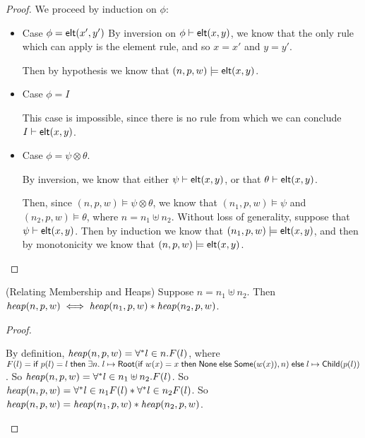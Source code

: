 \begin{proof}
We proceed by induction on $\phi$: 
\begin{itemize}
  \item Case $\phi = \mathsf{elt}({x'}, {y'})$
    By inversion on ${\phi} \vdash \mathsf{elt}({x}, {y})$, we know that the only 
    rule which can apply is the element rule, and so $x = x'$ and $y = y'$. 

    Then by hypothesis we know that $(n, p, w) \models \mathsf{elt}({x}, {y})$. 

  \item Case $\phi = I$

    This case is impossible, since there is no rule from which we can
    conclude ${I} \vdash \mathsf{elt}({x}, {y})$. 

  \item Case $\phi = \psi \otimes \theta$. 

    By inversion, we know that either ${\psi} \vdash \mathsf{elt}({x}, {y})$, or 
    that ${\theta} \vdash \mathsf{elt}({x}, {y})$. 

    Then, since $(n, p, w) \models \psi \otimes \theta$, we know 
    that $(n_1, p, w) \models \psi$ and $(n_2, p, w) \models \theta$,
    where $n = n_1 \uplus n_2$. Without loss of generality, 
    suppose that ${\psi} \vdash \mathsf{elt}({x}, {y})$. Then by induction we know
    that $(n_1, p, w) \models \mathsf{elt}({x}, {y})$, and then by monotonicity 
    we know that $(n, p, w) \models \mathsf{elt}({x}, {y})$. 
\end{itemize}
\end{proof}

\begin{lemma}{(Relating Membership and Heaps)}
Suppose $n = n_1 \uplus n_2$. Then $\mathit{heap}(n, p, w) \iff \mathit{heap}(n_1, p, w) * \mathit{heap}(n_2, p, w)$. 
\end{lemma}

\begin{proof}
  \begin{specification}
    \nextline By definition, $\mathit{heap}(n, p, w) =  \forall^{*} l \in n. F(l)$, where
    \nextline  $F(l) = \mathsf{if}\;{p(l) = l}\;\mathsf{then}\;{\exists n.\; l \mapsto \mathsf{Root}(\mathsf{if}\;{w(x) = x}\;\mathsf{then}\;{\mathsf{None}}\;\mathsf{else}\;{\mathsf{Some}(w(x))}, n)}\;\mathsf{else}\;{l \mapsto \mathsf{Child}(p(l))}$.
    \nextline So $\mathit{heap}(n, p, w) =  \forall^{*} l \in n_1 \uplus n_2. F(l)$. 
    \nextline So $\mathit{heap}(n, p, w) =  \forall^{*} l \in n_1 F(l) * \forall^{*} l \in n_2 F(l)$. 
    \nextline So $\mathit{heap}(n, p, w) = \mathit{heap}(n_1, p, w) * \mathit{heap}(n_2, p, w)$. 
  \end{specification}
\end{proof}

